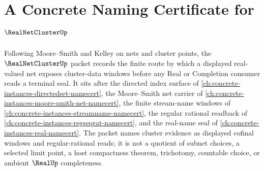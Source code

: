 \chapter{A Concrete Naming Certificate for $\RealNetClusterUp$}
\label{ch:concrete-instances-real-net-cluster-namecert}

Following Moore--Smith and Kelley on nets and cluster points, the $\RealNetClusterUp$ packet records the finite route by which a displayed real-valued net exposes cluster-data windows before any Real or Completion consumer reads a terminal seal. It sits after the directed index surface of \autoref{ch:concrete-instances-directedset-namecert}, the Moore--Smith net carrier of \autoref{ch:concrete-instances-moore-smith-net-namecert}, the finite stream-name windows of \autoref{ch:concrete-instances-streamname-namecert}, the regular rational readback of \autoref{ch:concrete-instances-regseqrat-namecert}, and the real-name seal of \autoref{ch:concrete-instances-real-namecert}. The packet names cluster evidence as displayed cofinal windows and regular-rational reads; it is not a quotient of subnet choices, a selected limit point, a host compactness theorem, trichotomy, countable choice, or ambient $\RealUp$ completeness.

